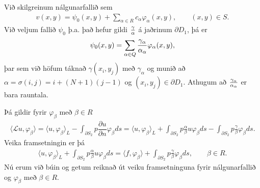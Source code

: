 \documentclass[a4paper,10pt,icelandic]{sphinxmanual}
\begin{document}
Við skilgreinum nálgunarfallið sem
\begin{equation*}
\begin{split}v(x,y)=\psi_0(x,y)+\sum_{\alpha\in R} c_\alpha\varphi_\alpha(x,y), \qquad (x,y)\in S.\end{split}
\end{equation*}
Við veljum fallið \(\psi_0\) þ.a. það hefur gildi \({\gamma\over \alpha}\) á jaðrinum \(\partial D_1\), þá er
\begin{equation*}
\begin{split}\psi_0(x,y)=\sum_{\alpha\in Q} {\gamma_\alpha\over \alpha_\alpha} \varphi_\alpha(x,y),\end{split}
\end{equation*}
þar sem við höfum táknað \(\gamma(x_i, y_j)\) með \(\gamma_\alpha\) og munið að \(\alpha=\sigma(i,j)=i+(N+1)(j-1)\) og \((x_i,y_j)\in \partial D_1\).
Athugum að  \({\gamma_\alpha\over \alpha_\alpha}\) er bara rauntala.

Þá gildir fyrir \(\varphi_\beta\) með \(\beta\in R\)
\begin{equation*}
\begin{split}\langle \mathcal L u, \varphi_\beta\rangle=
\langle u, \varphi_\beta \rangle_L -\int_{\partial S_2} p\dfrac{\partial u}{\partial n} \varphi_\beta ds=
\langle u, \varphi_\beta \rangle_L +\int_{\partial S_2} p\frac{\alpha}{\beta} u\varphi_\beta ds-\int_{\partial S_2} p\frac{\gamma}{\beta} \varphi_\beta ds.\end{split}
\end{equation*}
Veika framsetningin er þá
\begin{equation*}
\begin{split}\langle u, \varphi_\beta \rangle_L +\int_{\partial S_2} p\frac{\alpha}{\beta} u\varphi_\beta ds= \langle f, \varphi_\beta\rangle+ \int_{\partial S_2} p\frac{\gamma}{\beta} \varphi_\beta ds, \qquad \beta\in R.\end{split}
\end{equation*}
Nú erum við búin og getum reiknað út veiku framsetninguna fyrir nálgunarfallið og \(\varphi_\beta\) með \(\beta\in R\).
\end{document}
